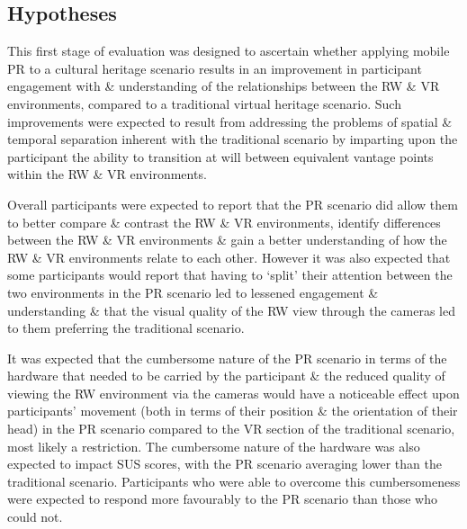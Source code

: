 	
	
	
	


\subsection{Hypotheses}
\label{stage1hypotheses}
This first stage of evaluation was designed to ascertain whether applying mobile PR to a cultural heritage scenario results in an improvement in participant engagement with \& understanding of the relationships between the RW \& VR environments, compared to a traditional virtual heritage scenario. Such improvements were expected to result from addressing the problems of spatial \& temporal separation inherent with the traditional scenario by imparting upon the participant the ability to transition at will between equivalent vantage points within the RW \& VR environments.

Overall participants were expected to report that the PR scenario did allow them to better compare \& contrast the RW \& VR environments, identify differences between the RW \& VR environments \& gain a better understanding of how the RW \& VR environments relate to each other. However it was also expected that some participants would report that having to `split' their attention between the two environments in the PR scenario led to lessened engagement \& understanding \& that the visual quality of the RW view through the cameras led to them preferring the traditional scenario.

It was expected that the cumbersome nature of the PR scenario in terms of the hardware that needed to be carried by the participant \& the reduced quality of viewing the RW environment via the cameras would have a noticeable effect upon participants' movement (both in terms of their position \& the orientation of their head) in the PR scenario compared to the VR section of the traditional scenario, most likely a restriction. The cumbersome nature of the hardware was also expected to impact SUS scores, with the PR scenario averaging lower than the traditional scenario. Participants who were able to overcome this cumbersomeness were expected to respond more favourably to the PR scenario than those who could not.

